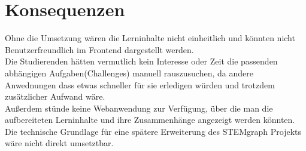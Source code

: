 \section{Konsequenzen}

Ohne die Umsetzung wären die Lerninhalte nicht einheitlich und könnten nicht Benutzerfreundlich im Frontend dargestellt werden.
\\
Die Studierenden hätten vermutlich kein Interesse oder Zeit die passenden abhängigen Aufgaben(Challenges) manuell rauszusuchen, da andere Anwednungen dass etwas schneller für sie erledigen würden und trotzdem zusätzlicher Aufwand wäre.
\\
Außerdem stünde keine Webanwendung zur Verfügung, über die man die aufbereiteten Lerninhalte und ihre Zusammenhänge angezeigt werden könnten.
Die technische Grundlage für eine spätere Erweiterung des STEMgraph Projekts wäre nicht direkt umsetztbar.